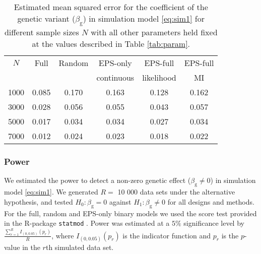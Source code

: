 \documentclass[10pt,a4paper]{article}
\begin{document}
\begin{table}[h]
\centering
\begin{tabular}{cccccc}
\hline
\rule{0pt}{2.5ex}
  $N$& Full & Random & EPS-only & EPS-full & EPS-full \\ 
   & & & continuous & likelihood & MI \\
  \hline
  \rule{0pt}{2.5ex}
  1000 & 0.085 & 0.170 & 0.163 & 0.128 & 0.162 \\ 
  3000 & 0.028 & 0.056 & 0.055 & 0.043 & 0.057 \\ 
  5000 & 0.017 & 0.034 & 0.034 & 0.027 & 0.034 \\ 
  7000 & 0.012 & 0.024 & 0.023 & 0.018 & 0.022 \\ 
   \hline
\end{tabular}
	\caption{Estimated mean squared error for the coefficient of the genetic variant ($\beta_{\text{g}}$) in simulation model \eqref{eq:sim1} for different sample sizes $N$ with all other parameters held fixed at the values described in Table \ref{tab:param}.}
	\label{tab:sim1mse}
\end{table}

\subsubsection{Power}
We estimated the power to detect a non-zero genetic effect ($\beta_{\text{g}} \neq 0$) in simulation model \eqref{eq:sim1}. We generated $R = $ 10 000 data sets under the alternative hypothesis, and tested $H_0: \beta_{\text{g}} = 0$ against $H_1: \beta_{\text{g}} \neq 0$ for all designs and methods. For the full, random and EPS-only binary models we used the score test provided in the R-package \texttt{statmod} \citep{statmod}. Power was estimated at a $5\%$ significance level by $ \frac{\sum_{r=1}^R I_{(0, 0.05)}(p_r)}{R}$, where $I_{(0, 0.05)}(p_r)$ is the indicator function and $p_r$ is the $p$-value in the $r$th simulated data set.
\end{document}
